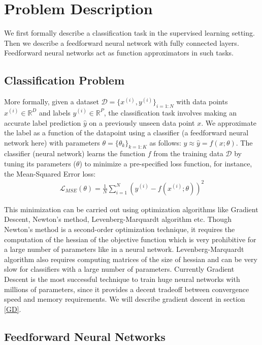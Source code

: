 \section{Problem Description}
\label{ProbDesc}

We first formally describe a classification task in the supervised learning setting. Then we describe a feedforward neural network with fully connected layers. Feedforward neural networks act as function approximators in such tasks.

\subsection{Classification Problem}
\label{sub:ClassProb}

More formally, given a dataset $\mathcal{D} = \{x^{(i)},y^{(i)}\}_{i=1:N}$ with data points $x^{(i)} \in \mathbb{R}^D$ and labels $y^{(i)} \in \mathbb{R}^P$, the classification task involves making an accurate label prediction $\hat{y}$ on a previously unseen data point $x$. We approximate the label as a function of the datapoint using a classifier (a feedforward neural network here) with parameters $\theta = \{\theta_k\}_{k=1:K}$ as follows: $y \approx \hat{y} = f(x; \theta)$.
The classifier (neural network) learns the function $f$ from the training data $\mathcal{D}$ by tuning its parameters ($\theta$) to minimize a pre-specified loss function, for instance, the Mean-Squared Error loss:
\begin{align} \label{LMSE}
\mathcal{L}_{MSE} (\theta) = \frac{1}{N}\sum_{i=1}^N ( y^{(i)} - f(x^{(i)}; \theta))^2
\end{align}

This minimization can be carried out using optimization algorithms like Gradient Descent, Newton's method, Levenberg-Marquardt algorithm etc.
Though Newton's method is a second-order optimization technique, it requires the computation of the hessian of the objective function which is very prohibitive for a large number of parameters like in a neural network.
Levenberg-Marquardt algorithm also requires computing matrices of the size of hessian and can be very slow for classifiers with a large number of parameters.
Currently Gradient Descent is the most successful technique to train huge neural networks with millions of parameters, since it provides a decent tradeoff between convergence speed and memory requirements.
We will describe gradient descent in section \ref{GD}.

\subsection{Feedforward Neural Networks}
\label{sub:FNN}

